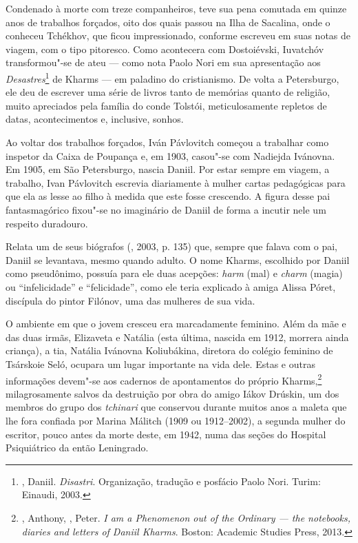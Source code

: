 Condenado à morte com treze companheiros, teve sua pena comutada
em quinze anos de trabalhos forçados, oito dos quais passou na
Ilha de Sacalina, onde o conheceu Tchékhov, que ficou impressionado,
conforme escreveu em suas notas de viagem, com o tipo pitoresco.
Como acontecera com Dostoiévski, Iuvatchóv transformou"-se de ateu
--- como nota Paolo Nori em sua apresentação aos
\emph{Desastres}\footnote{, Daniil.
\emph{Disastri}. Organização, tradução e posfácio Paolo Nori.
Turim: Einaudi, 2003.} de Kharms --- em paladino do cristianismo.
De volta a Petersburgo, ele deu de escrever uma série de livros
tanto de memórias quanto de religião, muito apreciados pela
família do conde Tolstói, meticulosamente repletos de datas,
acontecimentos e, inclusive, sonhos.

Ao voltar dos trabalhos forçados, Iván Pávlovitch começou a
trabalhar como inspetor da Caixa de Poupança e, em 1903, casou"-se
com Nadiejda Ivánovna. Em 1905, em São Petersburgo, nascia Daniil.
Por estar sempre em viagem, a trabalho, Ivan Pávlovitch escrevia
diariamente à mulher cartas pedagógicas para que ela as lesse ao
filho à medida que este fosse crescendo. A figura desse pai
fantasmagórico fixou"-se no imaginário de Daniil de forma a
incutir nele um respeito duradouro.

Relata um de seus biógrafos (, 2003, p. 135) que, sempre
que falava com o pai, Daniil se levantava, mesmo quando adulto.
O nome Kharms, escolhido por Daniil como pseudônimo, possuía para
ele duas acepções: \emph{harm} (mal) e \emph{charm} (magia) ou
``infelicidade'' e ``felicidade'', como ele teria explicado à
amiga Alissa Póret, discípula do pintor Filónov, uma das mulheres
de sua vida.

O ambiente em que o jovem cresceu era marcadamente feminino. Além
da mãe e das duas irmãs, Elizaveta e Natália (esta última, nascida
em 1912, morrera ainda criança), a tia, Natália Ivánovna Koliubákina,
diretora do colégio feminino de Tsárskoie Seló, ocupara um lugar
importante na vida dele. Estas e outras informações devem"-se aos
cadernos de apontamentos do próprio Kharms,\footnote{,
Anthony, , Peter. \emph{I am a Phenomenon out of the
Ordinary --- the notebooks, diaries and letters of Daniil Kharms}.
Boston: Academic Studies Press, 2013.} milagrosamente salvos da
destruição por obra do amigo Iákov Drúskin, um dos membros do
grupo dos \emph{tchinari} que conservou durante muitos anos a maleta
que lhe fora confiada por Marina Málitch (1909 ou 1912--2002), a
segunda mulher do escritor, pouco antes da morte deste, em 1942,
numa das seções do Hospital Psiquiátrico da então Leningrado.

